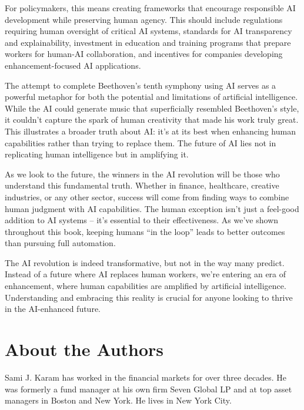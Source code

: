 \documentclass[
  Letterpaper,
]{scrbook}
\begin{document}
For policymakers, this means creating frameworks that encourage
responsible AI development while preserving human agency. This should
include regulations requiring human oversight of critical AI systems,
standards for AI transparency and explainability, investment in
education and training programs that prepare workers for human-AI
collaboration, and incentives for companies developing
enhancement-focused AI applications.

The attempt to complete Beethoven's tenth symphony using AI serves as a
powerful metaphor for both the potential and limitations of artificial
intelligence. While the AI could generate music that superficially
resembled Beethoven's style, it couldn't capture the spark of human
creativity that made his work truly great. This illustrates a broader
truth about AI: it's at its best when enhancing human capabilities
rather than trying to replace them. The future of AI lies not in
replicating human intelligence but in amplifying it.

As we look to the future, the winners in the AI revolution will be those
who understand this fundamental truth. Whether in finance, healthcare,
creative industries, or any other sector, success will come from finding
ways to combine human judgment with AI capabilities. The human exception
isn't just a feel-good addition to AI systems -- it's essential to their
effectiveness. As we've shown throughout this book, keeping humans ``in
the loop'' leads to better outcomes than pursuing full automation.

The AI revolution is indeed transformative, but not in the way many
predict. Instead of a future where AI replaces human workers, we're
entering an era of enhancement, where human capabilities are amplified
by artificial intelligence. Understanding and embracing this reality is
crucial for anyone looking to thrive in the AI-enhanced future.


\chapter*{About the Authors}\label{about-the-authors}


Sami J. Karam has worked in the financial markets for over three
decades. He was formerly a fund manager at his own firm Seven Global LP
and at top asset managers in Boston and New York. He lives in New York
City.
\end{document}
